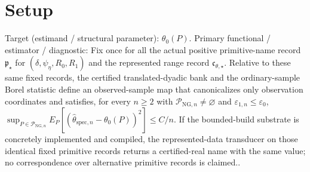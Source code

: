 \documentclass{article}
\begin{document}
\section{Setup}

Target (estimand / structural parameter): \(\theta_0(P)\).
Primary functional / estimator / diagnostic: Fix once for all the actual positive primitive-name record \(\mathfrak p_{\star}\) for \((\delta,\psi_{\eta},R_0,R_1)\) and the represented range record \(\mathfrak c_{\theta,\star}\). Relative to these same fixed records, the certified translated-dyadic bank and the ordinary-sample Borel statistic define an observed-sample map that canonicalizes only observation coordinates and satisfies, for every \(n\ge2\) with \(\mathcal P_{\mathrm{NG},n}\neq\varnothing\) and \(\varepsilon_{1,n}\le\varepsilon_0\), \(\sup_{P\in\mathcal P_{\mathrm{NG},n}}E_P[(\widehat\theta_{\mathrm{spec},n}-\theta_0(P))^2]\le C/n\). If the bounded-build substrate is concretely implemented and compiled, the represented-data transducer on those identical fixed primitive records returns a certified-real name with the same value; no correspondence over alternative primitive records is claimed..
\end{document}
